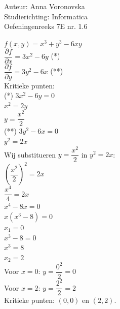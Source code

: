 \documentclass[a4paper]{article}
\begin{document}
  
\noindent \large Auteur: Anna Voronovska \\
\noindent \large Studierichting: Informatica\\
\noindent \large Oefeningenreeks 7E nr. 1.6\\

\medskip

\normalsize

$f(x, y)= x^3+y^3-6xy$\\

$\dfrac{\partial f}{\partial x} = 3x^2 -6y$ (*)\\

$\dfrac{\partial f}{\partial y} = 3y^2 -6x$ (**)\\

Kritieke punten:\\

(*) $3x^2-6y=0$\\

    $x^2=2y$\\

    $y=\dfrac{x^2}{2}$\\
    
(**) $3y^2 -6x=0$\\

	 $y^2=2x$\\
	 
Wij substitueren $y=\dfrac{x^2}{2}$ in $y^2=2x$:\\

$\left(\dfrac{x^2}{2}\right)^2 =2x$\\

$\dfrac{x^4}{4}=2x$\\

$x^4-8x=0$\\

$x(x^3-8)=0$\\

$x_1=0$ \\ 

$x^3-8=0$\\

$x^3=8$\\

$x_2=2$\\

Voor $x=0$: $y = \dfrac{0^2}{2} = 0$\\

Voor $x=2$: $y = \dfrac{2^2}{2} = 2$\\

Kritieke punten: $(0,0)$ en $(2,2)$.\\
\end{document}
